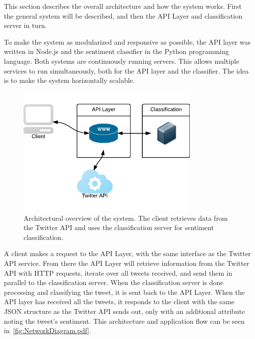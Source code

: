 This section describes the overall architecture and how the system works. First the general system will be described, and then the API Layer and classification server in turn.  

To make the system as modularized and responsive as possible, the API layer was written in Node.js and the sentiment classifier in the Python programming language. Both systems are continuously running servers. This allows multiple services to run simultaneously, both for the API layer and the classifier. The idea is to make the system horizontally scalable.

\begin{figure}[ht]
 \begin{center}
     \includegraphics[width=0.8\textwidth]{./figs/NetworkDiagram.pdf}
 \end{center}
 \caption[Architectural overview of the system.]{Architectural overview of the system. The client retrieves data from the Twitter API and uses the classification server for sentiment classification.}
 \label{fig:NetworkDiagram.pdf}
\end{figure}

A client makes a request to the API Layer, with the same interface as the Twitter API service. From there the API Layer will retrieve information from the Twitter API with HTTP requests, iterate over all tweets received, and send them in parallel to the classification server. When the classification server is done processing and classifying the tweet, it is sent back to the API Layer. When the API layer has received all the tweets, it responds to the client with the same JSON structure as the Twitter API sends out, only with an additional attribute noting the tweet's sentiment. This architecture and application flow can be seen in~\autoref{fig:NetworkDiagram.pdf}. 

